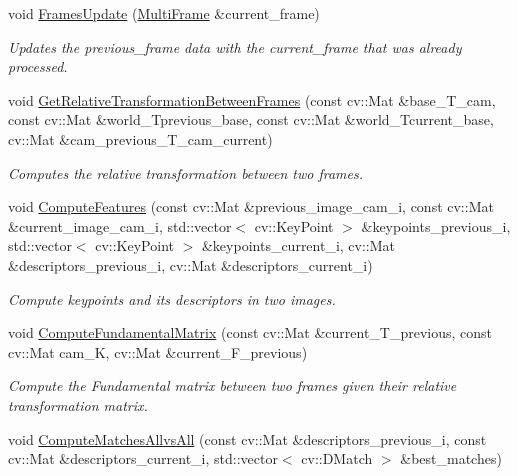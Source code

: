 \begin{DoxyCompactItemize}
void \hyperlink{classcoldetector_1_1CollisionDetector_a3e5a171f0d396656745e84b8e7a80cd9}{Frames\+Update} (\hyperlink{classMultiFrame}{Multi\+Frame} \&current\+\_\+frame)
\begin{DoxyCompactList}\small\item\em Updates the previous\+\_\+frame data with the current\+\_\+frame that was already processed. \end{DoxyCompactList}\item 
void \hyperlink{classcoldetector_1_1CollisionDetector_a01855b9eb3534d701df52f0f503fdc1e}{Get\+Relative\+Transformation\+Between\+Frames} (const cv\+::\+Mat \&base\+\_\+\+T\+\_\+cam, const cv\+::\+Mat \&world\+\_\+\+Tprevious\+\_\+base, const cv\+::\+Mat \&world\+\_\+\+Tcurrent\+\_\+base, cv\+::\+Mat \&cam\+\_\+previous\+\_\+\+T\+\_\+cam\+\_\+current)
\begin{DoxyCompactList}\small\item\em Computes the relative transformation between two frames. \end{DoxyCompactList}\item 
void \hyperlink{classcoldetector_1_1CollisionDetector_af385733b461bda4f537cb97f7616a352}{Compute\+Features} (const cv\+::\+Mat \&previous\+\_\+image\+\_\+cam\+\_\+i, const cv\+::\+Mat \&current\+\_\+image\+\_\+cam\+\_\+i, std\+::vector$<$ cv\+::\+Key\+Point $>$ \&keypoints\+\_\+previous\+\_\+i, std\+::vector$<$ cv\+::\+Key\+Point $>$ \&keypoints\+\_\+current\+\_\+i, cv\+::\+Mat \&descriptors\+\_\+previous\+\_\+i, cv\+::\+Mat \&descriptors\+\_\+current\+\_\+i)
\begin{DoxyCompactList}\small\item\em Compute keypoints and its descriptors in two images. \end{DoxyCompactList}\item 
void \hyperlink{classcoldetector_1_1CollisionDetector_ada1b7a3f4693f782da90feb111a59acc}{Compute\+Fundamental\+Matrix} (const cv\+::\+Mat \&current\+\_\+\+T\+\_\+previous, const cv\+::\+Mat cam\+\_\+K, cv\+::\+Mat \&current\+\_\+\+F\+\_\+previous)
\begin{DoxyCompactList}\small\item\em Compute the Fundamental matrix between two frames given their relative transformation matrix. \end{DoxyCompactList}\item 
void \hyperlink{classcoldetector_1_1CollisionDetector_a1cf35720359d0e9571e8ec233b6c2238}{Compute\+Matches\+Allvs\+All} (const cv\+::\+Mat \&descriptors\+\_\+previous\+\_\+i, const cv\+::\+Mat \&descriptors\+\_\+current\+\_\+i, std\+::vector$<$ cv\+::\+D\+Match $>$ \&best\+\_\+matches)

\end{DoxyCompactItemize}
